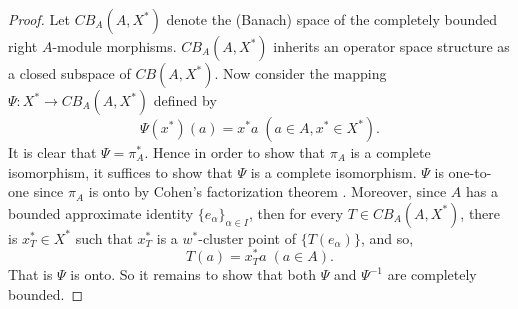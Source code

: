\documentclass[10pt]{amsart}
\numberwithin{thm}{section}
\numberwithin{equation}{section}
\begin{document}
\begin{proof}
Let $CB_A(A,X^*)$ denote the (Banach) space of the completely bounded right $A$-module morphisms.
$CB_A(A,X^*)$ inherits an operator space structure as a closed subspace of $CB(A,X^*)$. Now
consider the mapping $\Psi : X^* \to CB_A(A,X^*)$ defined by
	$$\Psi(x^*)(a)=x^*a \; (a\in A, x^*\in X^*).$$
It is clear that $\Psi=\pi_A^*$. Hence in order to show that $\pi_A$ is a 
complete isomorphism, it suffices to show that $\Psi$ is a complete isomorphism.
$\Psi$ is one-to-one since $\pi_A$ is onto by Cohen's factorization theorem 
\cite[Corollary 2.9.26]{D}. Moreover, since 
$A$ has a bounded approximate identity $\{e_\alpha\}_{\alpha \in I}$, then for every
$T\in CB_A(A,X^*)$, there is $x^*_T\in X^*$ such that $x^*_T$ is a $w^*$-cluster point of $\{ T(e_\alpha)\}$, 
and so,
$$T(a)=x_T^*a \;(a\in A).$$
That is $\Psi$ is onto. So it remains to show that both $\Psi$ and $\Psi^{-1}$ 
are completely bounded. 


\end{proof}
\end{document}
